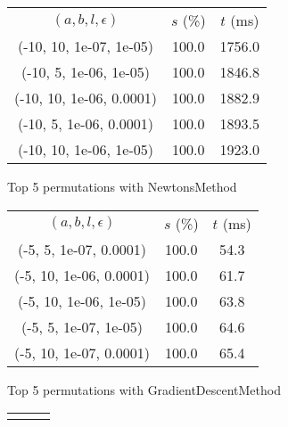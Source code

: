 \begin{figure}[H]
\label{fig:param_comp_NegativeEntropy_DichotomousSearch}
\begin{subfigure}[ht]{.5\textwidth}
\begin{tabular}{|c|c|c|}
\hline
\rowcolor{gray!25}
\multicolumn{3}{|c|}{NewtonsMethod} \\
\hline
\rowcolor{gray!25}
$(a,b,l,\epsilon)$ & $s$ (\%) & $t$ (ms) \\
\hline
(-10, 10, 1e-07, 1e-05) & 100.0 & 1756.0 \\
(-10, 5, 1e-06, 1e-05) & 100.0 & 1846.8 \\
(-10, 10, 1e-06, 0.0001) & 100.0 & 1882.9 \\
(-10, 5, 1e-06, 0.0001) & 100.0 & 1893.5 \\
(-10, 10, 1e-06, 1e-05) & 100.0 & 1923.0 \\
\hline
\end{tabular}
\caption{Top 5 permutations with NewtonsMethod}
\label{subfig:param_comp_NegativeEntropy_NewtonsMethod_DichotomousSearch}
\end{subfigure}
\hfill
\begin{subfigure}[ht]{.5\textwidth}
\begin{tabular}{|c|c|c|}
\hline
\rowcolor{gray!25}
\multicolumn{3}{|c|}{GradientDescentMethod} \\
\hline
\rowcolor{gray!25}
$(a,b,l,\epsilon)$ & $s$ (\%) & $t$ (ms) \\
\hline
(-5, 5, 1e-07, 0.0001) & 100.0 & 54.3 \\
(-5, 10, 1e-06, 0.0001) & 100.0 & 61.7 \\
(-5, 10, 1e-06, 1e-05) & 100.0 & 63.8 \\
(-5, 5, 1e-07, 1e-05) & 100.0 & 64.6 \\
(-5, 10, 1e-07, 0.0001) & 100.0 & 65.4 \\
\hline
\end{tabular}
\caption{Top 5 permutations with GradientDescentMethod}
\label{subfig:param_comp_NegativeEntropy_GradientDescentMethod_DichotomousSearch}
\end{subfigure}
\hfill
\begin{subfigure}[ht]{.5\textwidth}
\begin{tabular}{|c|c|c|}
\hline
\rowcolor{gray!25}

\end{tabular}
\end{subfigure}
\end{figure}
